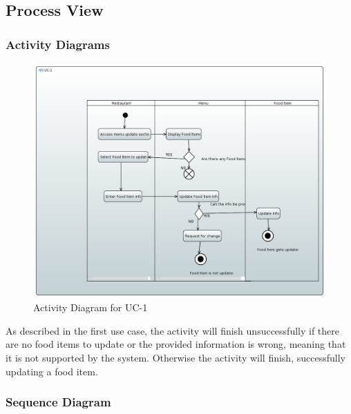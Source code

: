 \subsection{Process View}
\subsubsection{Activity Diagrams} \label{seq_diag}

\begin{figure}[h!]
\begin{center}
\includegraphics[scale=0.35]{FIGS/UC-1.PNG}
    \caption{Activity Diagram for UC-1}
    \label{fig:act_diag1}
\end{center}
\end{figure}

As described in the first use case, the activity will finish unsuccessfully if there are no food items to update or the provided information is wrong, meaning that it is not supported by the system. Otherwise the activity will finish, successfully updating a food item.

\subsubsection{Sequence Diagram} \label{seq_diag}

